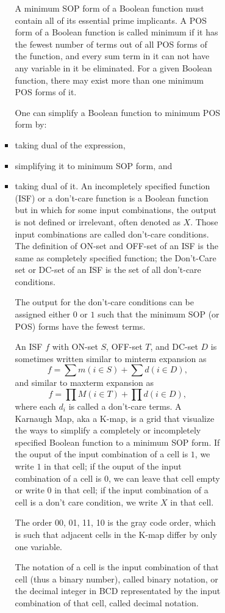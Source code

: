 \documentclass[a4paper,12pt]{article}
\begin{document}
\begin{itemize}
\begin{itemize}
\begin{itemize}
\begin{itemize}
\begin{itemize}
\begin{itemize}
\begin{itemize}
A minimum SOP form of a Boolean function must contain all of its essential prime implicants.
A POS form of a Boolean function is called minimum if it has the fewest number of terms out of all POS forms of the function, and every sum term in it can not have any variable in it be eliminated. For a given Boolean function, there may exist more than one minimum POS forms of it.

One can simplify a Boolean function to minimum POS form by:
\ben
\item taking dual of the expression,
\item simplifying it to minimum SOP form, and
\item taking dual of it.
\een
{}
An incompletely specified function (ISF) or a don't-care function is a Boolean function but in which for some input combinations, the output is not defined or irrelevant, often denoted as $X$. Those input combinations are called don't-care conditions. The definition of ON-set and OFF-set of an ISF is the same as completely specified function; the Don't-Care set or DC-set of an ISF is the set of all don't-care conditions.

The output for the don't-care conditions can be assigned either $0$ or $1$ such that the minimum SOP (or POS) forms have the fewest terms.

An ISF $f$ with ON-set $S$, OFF-set $T$, and DC-set $D$ is sometimes written similar to minterm expansion as
\[f=\sum m(i\in S)+\sum d(i\in D),\]
and similar to maxterm expansion as
\[f=\prod M(i\in T)+\prod d(i\in D),\]
where each $d_i$ is called a don't-care terms.
A Karnaugh Map, aka a K-map, is a grid that visualize the ways to simplify a completely or incompletely specified Boolean function to a minimum SOP form.
If the ouput of the input combination of a cell is $1$, we write $1$ in that cell; if the ouput of the input combination of a cell is $0$, we can leave that cell empty or write $0$ in that cell; if the input combination of a cell is a don't care condition, we write $X$ in that cell.

The order 00, 01, 11, 10 is the gray code order, which is such that adjacent cells in the K-map differ by only one variable.

The notation of a cell is the input combination of that cell (thus a binary number), called binary notation, or the decimal integer in BCD representated by the input combination of that cell, called decimal notation.


\end{itemize}
\end{itemize}
\end{itemize}
\end{itemize}
\end{itemize}
\end{itemize}
\end{itemize}
\end{document}

